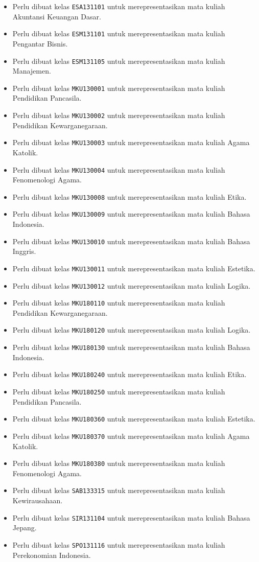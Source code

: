 \begin{enumerate}
\begin{itemize}
		\item Perlu dibuat kelas \texttt{ESA131101} untuk merepresentasikan mata kuliah Akuntansi Keuangan Dasar.
		\item Perlu dibuat kelas \texttt{ESM131101} untuk merepresentasikan mata kuliah Pengantar Bisnis.
		\item Perlu dibuat kelas \texttt{ESM131105} untuk merepresentasikan mata kuliah Manajemen.
		\item Perlu dibuat kelas \texttt{MKU130001} untuk merepresentasikan mata kuliah Pendidikan Pancasila.
		\item Perlu dibuat kelas \texttt{MKU130002} untuk merepresentasikan mata kuliah Pendidikan Kewarganegaraan.
		\item Perlu dibuat kelas \texttt{MKU130003} untuk merepresentasikan mata kuliah Agama Katolik.
		\item Perlu dibuat kelas \texttt{MKU130004} untuk merepresentasikan mata kuliah Fenomenologi Agama.
		\item Perlu dibuat kelas \texttt{MKU130008} untuk merepresentasikan mata kuliah Etika.
		\item Perlu dibuat kelas \texttt{MKU130009} untuk merepresentasikan mata kuliah Bahasa Indonesia.
		\item Perlu dibuat kelas \texttt{MKU130010} untuk merepresentasikan mata kuliah Bahasa Inggris.
		\item Perlu dibuat kelas \texttt{MKU130011} untuk merepresentasikan mata kuliah Estetika.
		\item Perlu dibuat kelas \texttt{MKU130012} untuk merepresentasikan mata kuliah Logika.
		\item Perlu dibuat kelas \texttt{MKU180110} untuk merepresentasikan mata kuliah Pendidikan Kewarganegaraan.
		\item Perlu dibuat kelas \texttt{MKU180120} untuk merepresentasikan mata kuliah Logika.
		\item Perlu dibuat kelas \texttt{MKU180130} untuk merepresentasikan mata kuliah Bahasa Indonesia.
		\item Perlu dibuat kelas \texttt{MKU180240} untuk merepresentasikan mata kuliah Etika.
		\item Perlu dibuat kelas \texttt{MKU180250} untuk merepresentasikan mata kuliah Pendidikan Pancasila.
		\item Perlu dibuat kelas \texttt{MKU180360} untuk merepresentasikan mata kuliah Estetika.
		\item Perlu dibuat kelas \texttt{MKU180370} untuk merepresentasikan mata kuliah Agama Katolik.
		\item Perlu dibuat kelas \texttt{MKU180380} untuk merepresentasikan mata kuliah Fenomenologi Agama.
		\item Perlu dibuat kelas \texttt{SAB133315} untuk merepresentasikan mata kuliah Kewirausahaan.
		\item Perlu dibuat kelas \texttt{SIR131104} untuk merepresentasikan mata kuliah Bahasa Jepang.
		\item Perlu dibuat kelas \texttt{SPO131116} untuk merepresentasikan mata kuliah Perekonomian Indonesia.
	\end{itemize}
	

\end{enumerate}
